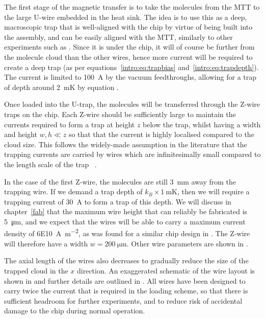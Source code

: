 The first stage of the magnetic transfer is to take the molecules from the MTT
to the large U-wire embedded in the heat sink.  The idea is to use this as a
deep, macroscopic trap that is well-aligned with the chip by virtue of being
built into the assembly, and can be easily aligned with the MTT, similarly to
other experiments such as .  Since it is under the chip, it
will of course be further from the molecule cloud than the other wires, hence
more current will be required to create a deep trap (as per
equations~\ref{intro:eq:trapbias} and~\ref{intro:eq:trapdepth}). The current is
limited to \SI{100}{\ampere} by the vacuum feedthroughs, allowing for a trap of
depth around \SI{2}{\milli\kelvin} by equation .

Once loaded into the U-trap, the molecules will be transferred through the
Z-wire traps on the chip. Each Z-wire should be sufficiently
large to maintain the currents required to form a trap at height $z$ below the
trap, whilst having a width and height  $w, h \ll z$ so that that the current
is highly localised compared to the cloud size.  This follows the widely-made
assumption in the literature that the trapping currents are carried by wires
which are infinitesimally small compared to the length scale of the trap
~\cite{2011Ac}.

In the case of the first Z-wire, the molecules are still \SI{3}{\milli\meter}
away from the trapping wire. If we demand a trap depth of
$k_B\times\SI{1}{\milli\kelvin}$, then we will require a trapping current of
\SI{30}{\ampere} to form a trap of this depth.  We will discuss in
chapter~\ref{fab} that the maximum wire height that can reliably be fabricated
is \SI{5}{\micro\meter}, and we expect that the wires will be able to carry a
maximum current density of \SI{6E10}{\ampere\per\meter\squared}, as was found
for a similar chip design in . The Z-wire will
therefore have a width $w=\SI{200}{\micro\meter}$. Other wire parameters are
shown in .

The axial length of the wires also decreases to gradually reduce the size of
the trapped cloud in the $x$ direction. An exaggerated schematic of the wire
layout is shown in  and further details are
outlined in . All wires have been designed to
carry twice the current that is required in the loading scheme, so that there
is sufficient headroom for further experiments, and to reduce risk of
accidental damage to the chip during normal operation.

